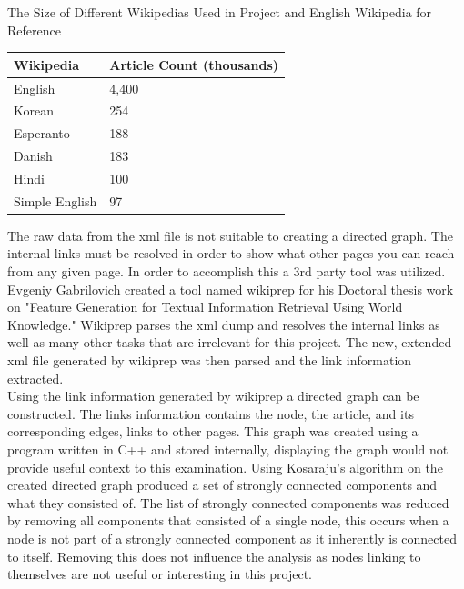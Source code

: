 \documentclass[twoside]{article}
\makeatletter
\newenvironment{tablehere}
  {\def\@captype{table}}
  {}
\makeatother
\begin{document}
\begin{multicols}{2}
\vfill

\columnbreak

\begin{tablehere}

\caption{The Size of Different Wikipedias Used in Project and English Wikipedia for Reference }

\begin{tabular}{| l | l |}

\hline

Wikipedia & Article Count  (thousands) \cite{wikipediaStatistics}   \\ \hline

English & 4,400 \\ \hline

Korean & 254 \\ \hline

Esperanto & 188  \\ \hline

Danish & 183 \\ \hline

Hindi & 100 \\ \hline

Simple English & 97  \\ \hline

\end{tabular}

\end{tablehere}

\vspace{10 mm}

The raw data from the xml file is not suitable to creating a directed graph. The internal links must be resolved
in order to show what other pages you can reach from any given page. In order to accomplish this a 3rd party tool
was utilized. Evgeniy Gabrilovich created a tool named wikiprep for his Doctoral thesis work on "Feature Generation for Textual
Information Retrieval Using World Knowledge." \cite{Gabrilovich} Wikiprep parses the xml dump and resolves the internal
links as well as many other tasks that are irrelevant for this project. The new, extended xml file generated
by wikiprep was then parsed and the link information extracted. \\

Using the link information generated by wikiprep a directed graph can be constructed. The links information
contains the node, the article, and its corresponding edges, links to other pages. This graph was 
created using a program written in C++ and stored internally, displaying the graph would not provide
useful context to this examination. Using Kosaraju's algorithm on the created directed graph produced 
a set of strongly connected components and what they consisted of. The list of strongly connected
components was reduced by removing all components that consisted of a single node, this occurs
when a node is not part of a strongly connected component as it inherently is connected to itself.
Removing this does not influence the analysis as nodes linking to themselves are not useful or
interesting in this project.\\


\end{multicols}
\end{document}
